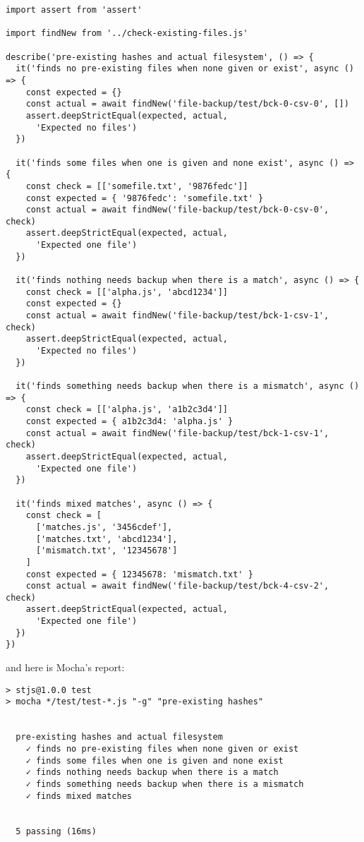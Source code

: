\documentclass[krantzl]{krantz}
\begin{document}
\begin{lstlisting}[frame=tblr]
import assert from 'assert'

import findNew from '../check-existing-files.js'

describe('pre-existing hashes and actual filesystem', () => {
  it('finds no pre-existing files when none given or exist', async () => {
    const expected = {}
    const actual = await findNew('file-backup/test/bck-0-csv-0', [])
    assert.deepStrictEqual(expected, actual,
      'Expected no files')
  })

  it('finds some files when one is given and none exist', async () => {
    const check = [['somefile.txt', '9876fedc']]
    const expected = { '9876fedc': 'somefile.txt' }
    const actual = await findNew('file-backup/test/bck-0-csv-0', check)
    assert.deepStrictEqual(expected, actual,
      'Expected one file')
  })

  it('finds nothing needs backup when there is a match', async () => {
    const check = [['alpha.js', 'abcd1234']]
    const expected = {}
    const actual = await findNew('file-backup/test/bck-1-csv-1', check)
    assert.deepStrictEqual(expected, actual,
      'Expected no files')
  })

  it('finds something needs backup when there is a mismatch', async () => {
    const check = [['alpha.js', 'a1b2c3d4']]
    const expected = { a1b2c3d4: 'alpha.js' }
    const actual = await findNew('file-backup/test/bck-1-csv-1', check)
    assert.deepStrictEqual(expected, actual,
      'Expected one file')
  })

  it('finds mixed matches', async () => {
    const check = [
      ['matches.js', '3456cdef'],
      ['matches.txt', 'abcd1234'],
      ['mismatch.txt', '12345678']
    ]
    const expected = { 12345678: 'mismatch.txt' }
    const actual = await findNew('file-backup/test/bck-4-csv-2', check)
    assert.deepStrictEqual(expected, actual,
      'Expected one file')
  })
})
\end{lstlisting}



\noindent and here is Mocha’s report:


\begin{lstlisting}[frame=tblr,backgroundcolor=\color{black!5}]
> stjs@1.0.0 test
> mocha */test/test-*.js "-g" "pre-existing hashes"


  pre-existing hashes and actual filesystem
    ✓ finds no pre-existing files when none given or exist
    ✓ finds some files when one is given and none exist
    ✓ finds nothing needs backup when there is a match
    ✓ finds something needs backup when there is a mismatch
    ✓ finds mixed matches


  5 passing (16ms)
\end{lstlisting}
\end{document}
